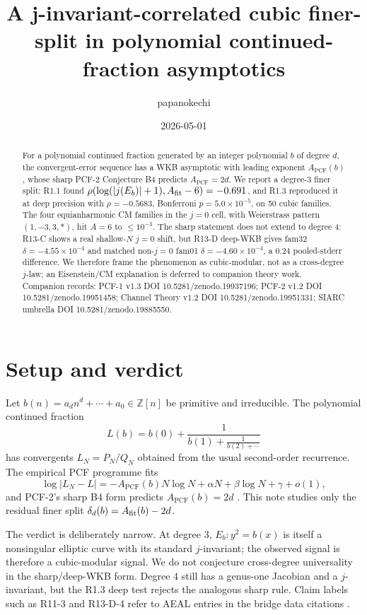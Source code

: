 \documentclass[11pt]{amsart}
\title[A j-invariant-correlated cubic finer-split]{A j-invariant-correlated cubic finer-split in polynomial continued-fraction asymptotics}
\author{papanokechi}
\date{2026-05-01}
\theoremstyle{plain}
\theoremstyle{definition}
\newcommand{\claim}[1]{\textup{\textsf{#1}}}
\newcommand{\PCF}{A_{\mathrm{PCF}}}
\begin{document}
\begin{abstract}
For a polynomial continued fraction generated by an integer polynomial \(b\) of degree \(d\), the convergent-error sequence has a WKB asymptotic with leading exponent \(\PCF(b)\), whose sharp PCF-2 Conjecture B4 predicts \(\PCF=2d\).  We report a degree-3 finer split: R1.1 found \(\rho(\log(|j(E_b)|+1),A_{\rm fit}-6)=-0.691\), and R1.3 reproduced it at deep precision with \(\rho=-0.5683\), Bonferroni \(p=5.0\times10^{-5}\), on 50 cubic families.  The four equianharmonic CM families in the \(j=0\) cell, with Weierstrass pattern \((1,-3,3,*)\), hit \(A=6\) to \(\le 10^{-3}\).  The sharp statement does not extend to degree 4: R13-C shows a real shallow-\(N\) \(j=0\) shift, but R13-D deep-WKB gives fam32 \(\delta=-4.55\times10^{-4}\) and matched non-\(j=0\) fam01 \(\delta=-4.60\times10^{-4}\), a \(0.24\) pooled-stderr difference.  We therefore frame the phenomenon as cubic-modular, not as a cross-degree \(j\)-law; an Eisenstein/CM explanation is deferred to companion theory work.  Companion records: PCF-1 v1.3 DOI 10.5281/zenodo.19937196; PCF-2 v1.2 DOI 10.5281/zenodo.19951458; Channel Theory v1.2 DOI 10.5281/zenodo.19951331; SIARC umbrella DOI 10.5281/zenodo.19885550.
\end{abstract}
\maketitle



\section{Setup and verdict}

Let \(b(n)=a_d n^d+\cdots+a_0\in \mathbb Z[n]\) be primitive and irreducible.  The polynomial continued fraction
\[
L(b)=b(0)+\frac{1}{b(1)+\frac{1}{b(2)+\cdots}}
\]
has convergents \(L_N=P_N/Q_N\) obtained from the usual second-order recurrence.  The empirical PCF programme fits
\[
\log |L_N-L|=-\PCF(b)N\log N+\alpha N+\beta \log N+\gamma+o(1),
\]
and PCF-2's sharp B4 form predicts \(\PCF(b)=2d\) \cite{pcf2v12}.  This note studies only the residual finer split \(\delta_d(b)=A_{\rm fit}(b)-2d\).

The verdict is deliberately narrow.  At degree \(3\), \(E_b:y^2=b(x)\) is itself a nonsingular elliptic curve with its standard \(j\)-invariant; the observed signal is therefore a cubic-modular signal.  We do not conjecture cross-degree universality in the sharp/deep-WKB form.  Degree \(4\) still has a genus-one Jacobian and a \(j\)-invariant, but the R1.3 deep test rejects the analogous sharp rule.  Claim labels such as \claim{R11-3} and \claim{R13-D-4} refer to AEAL entries in the bridge data citations \cite{r11bridge,r13bridge}.
\end{document}
